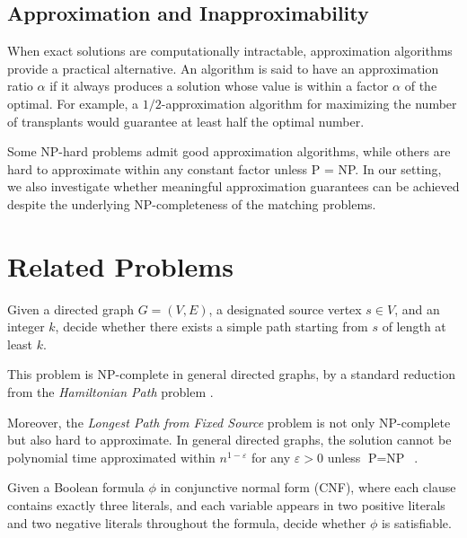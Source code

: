 \subsection*{Approximation and Inapproximability}

When exact solutions are computationally intractable, approximation algorithms provide a practical alternative. An algorithm is said to have an approximation ratio $\alpha$ if it always produces a solution whose value is within a factor $\alpha$ of the optimal. For example, a $1/2$-approximation algorithm for maximizing the number of transplants would guarantee at least half the optimal number.

Some NP-hard problems admit good approximation algorithms, while others are hard to approximate within any constant factor unless P = NP. In our setting, we also investigate whether meaningful approximation guarantees can be achieved despite the underlying NP-completeness of the matching problems.


\section{Related Problems}

\begin{problem}
\label{prob:longest_simple_path}
Given a directed graph $G = (V, E)$, a designated source vertex $s \in V$, and an integer $k$, decide whether there exists a simple path starting from $s$ of length at least $k$.
\end{problem}

This problem is NP-complete in general directed graphs, by a standard reduction from the \textit{Hamiltonian Path} problem \cite{garey1979computers}.

Moreover, the \textit{Longest Path from Fixed Source} problem is not only NP-complete but also hard to approximate. In general directed graphs, the solution cannot be polynomial time approximated
within $n^{1-\varepsilon}$ for any $\varepsilon  > 0$ unless $\text{P} = \text{NP}$~\cite{bjorklund2004approximating}.

\begin{problem}[2P2N-3SAT]
\label{prob:2p2n_3sat}
Given a Boolean formula $\phi$ in conjunctive normal form (CNF), where each clause contains exactly three literals, and each variable appears in two positive literals and two negative literals throughout the formula, decide whether $\phi$ is satisfiable.
\end{problem}

